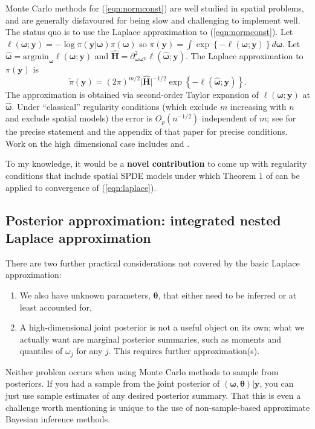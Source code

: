 \documentclass[12pt]{article}
\newcommand{\mb}[1]{\boldsymbol{#1}}
\newcommand{\Tr}{^{\textrm{T}}}
\newcommand{\params}{\mb{\theta}}
\newcommand{\response}{\mb{y}}
\begin{document}
Monte Carlo methods for (\ref{eqn:normconst}) are well studied in spatial problems, and are generally disfavoured for being slow
and challenging to implement well. The status quo is to use the Laplace approximation to (\ref{eqn:normconst}).
Let $\ell(\mb{\omega};\response) = -\log\pi(\response|\mb{\omega})\pi(\mb{\omega})$ so $\pi(\response) = \int\exp\left\{-\ell(\mb{\omega};\response)\right\}d\mb{\omega}$.
Let $\widehat{\mb{\omega}} = \text{argmin}_{\mb{\omega}}\ell(\mb{\omega};\response)$ and $\widehat{\mb{H}} = \partial^2_{\mb{\omega}\mb{\omega}\Tr}\ell(\widehat{\mb{\omega}};\response)$.
The Laplace approximation to $\pi(\response)$ is
\begin{equation}\label{eqn:laplace}
\widetilde{\pi}(\response) = (2\pi)^{m/2}\lvert\widehat{\mb{H}}\rvert^{-1/2}\exp\left\{-\ell(\widehat{\mb{\omega}};\response)\right\}.
\end{equation}
The approximation is obtained via second-order Taylor expansion of $\ell(\mb{\omega};\response)$ at $\widehat{\mb{\omega}}$.
Under ``classical'' regularity conditions (which exclude $m$ increasing with $n$ and exclude spatial models) the error is $O_p(n^{-1/2})$
independent of $m$; see \citet[Theorem 1]{bilodeau2024stochastic} for the precise statement and the appendix of that paper for precise
conditions. Work on the high dimensional case includes \citet{shun1995laplace} and \citet{tang2024highdim}.

To my knowledge, it would be a \textbf{novel contribution} to come up with regularity conditions that include spatial SPDE models
under which Theorem 1 of \citet{bilodeau2024stochastic} can be applied to convergence of (\ref{eqn:laplace}).

\subsection{Posterior approximation: integrated nested Laplace approximation}\label{subsec:inla}

There are two further practical considerations not covered by the basic Laplace approximation:
\begin{enumerate}
  \item We also have unknown parameters, $\params$, that either need to be inferred or at least accounted for,
  \item A high-dimensional joint posterior is not a useful object on its own; what we actually want are marginal posterior summaries, such as moments and quantiles of $\omega_j$ for any $j$. This requires further approximation(s).
\end{enumerate}
Neither problem occurs when using Monte Carlo methods to sample from posteriors. If you had a sample from the joint posterior of $(\mb{\omega},\params)|\response$, you can just use sample estimates of any desired posterior summary. That this is even a challenge worth mentioning
is unique to the use of non-sample-based approximate Bayesian inference methods.
\end{document}
